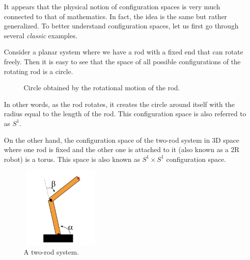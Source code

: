 \documentclass[12pt]{article}
\theoremstyle{definition}
\begin{document}
\bigskip

It appears that the physical notion of configuration spaces is very much connected to that of mathematics.
In fact, the idea is the same but rather generalized. To better understand configuration spaces, let us
first go through several \textit{classic} examples.

\bigskip

\cite{1} Consider a planar system where we have a rod with a fixed end that can rotate freely. Then it is
easy to see that the space of all possible configurations of the rotating rod is a circle.

\begin{figure}[H]
\centering
{}
\caption*{Circle obtained by the rotational motion of the rod.}
\end{figure}

In other words, as the rod rotates, it creates the circle around itself
with the radius equal to the length of the rod. This configuration space
is also referred to as $S^1$.

\bigskip

\cite{2} On the other hand, the configuration space of the two-rod
system in 3D space where one rod is fixed and the other one is attached to it (also known as a 2R robot)
is a torus. This space is also known as $S^1 \times S^1$ configuration space.

\begin{figure}[H]
\centering
\includegraphics[width=4cm, height=4cm]{two-rod-system}
\caption*{A two-rod system.}
\end{figure}
\end{document}
